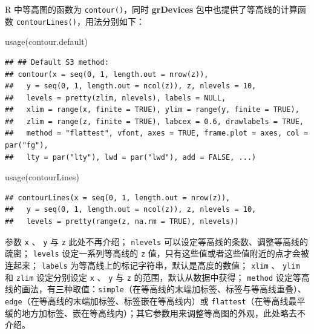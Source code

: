 \documentclass[
  b5paper,
  UTF8,twoside]{book}
\newenvironment{Shaded}{\begin{snugshade}}{\end{snugshade}}
\newcommand{\FunctionTok}[1]{\textcolor[rgb]{0.00,0.00,0.00}{#1}}
\newcommand{\NormalTok}[1]{#1}
\begin{document}
R 中等高图的函数为 \texttt{contour()}，同时 \textbf{grDevices} 包中也提供了等高线的计算函数 \texttt{contourLines()}，用法分别如下：

\begin{Shaded}
\begin{Highlighting}[]
\FunctionTok{usage}\NormalTok{(contour.default)}
\end{Highlighting}
\end{Shaded}

\begin{verbatim}
## ## Default S3 method:
## contour(x = seq(0, 1, length.out = nrow(z)),
##   y = seq(0, 1, length.out = ncol(z)), z, nlevels = 10,
##   levels = pretty(zlim, nlevels), labels = NULL,
##   xlim = range(x, finite = TRUE), ylim = range(y, finite = TRUE),
##   zlim = range(z, finite = TRUE), labcex = 0.6, drawlabels = TRUE,
##   method = "flattest", vfont, axes = TRUE, frame.plot = axes, col = par("fg"),
##   lty = par("lty"), lwd = par("lwd"), add = FALSE, ...)
\end{verbatim}

\begin{Shaded}
\begin{Highlighting}[]
\FunctionTok{usage}\NormalTok{(contourLines)}
\end{Highlighting}
\end{Shaded}

\begin{verbatim}
## contourLines(x = seq(0, 1, length.out = nrow(z)),
##   y = seq(0, 1, length.out = ncol(z)), z, nlevels = 10,
##   levels = pretty(range(z, na.rm = TRUE), nlevels))
\end{verbatim}

参数 \texttt{x} 、 \texttt{y} 与 \texttt{z} 此处不再介绍； \texttt{nlevels} 可以设定等高线的条数、调整等高线的疏密； \texttt{levels} 设定一系列等高线的 \texttt{z} 值，只有这些值或者这些值附近的点才会被连起来； \texttt{labels} 为等高线上的标记字符串，默认是高度的数值； \texttt{xlim} 、 \texttt{ylim} 和 \texttt{zlim} 设定分别设定 \texttt{x} 、 \texttt{y} 与 \texttt{z} 的范围，默认从数据中获得； \texttt{method} 设定等高线的画法，有三种取值：\texttt{\textquotesingle{}simple\textquotesingle{}}（在等高线的末端加标签、标签与等高线重叠）、\texttt{\textquotesingle{}edge\textquotesingle{}}（在等高线的末端加标签、标签嵌在等高线内）或 \texttt{\textquotesingle{}flattest\textquotesingle{}}（在等高线最平缓的地方加标签、嵌在等高线内）；其它参数用来调整等高图的外观，此处略去不介绍。
\end{document}
